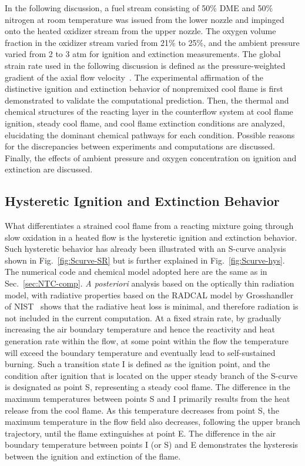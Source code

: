 In the following discussion, a fuel stream consisting of 50\% DME and 50\% nitrogen at room temperature was issued from the lower nozzle and impinged onto the heated oxidizer stream from the upper nozzle.  The oxygen volume fraction in the oxidizer stream varied from 21\% to 25\%, and the 
ambient pressure varied from 2 to 3 atm for ignition and extinction measurements.  The global strain rate used in the following discussion is defined as the pressure-weighted gradient of the axial flow velocity~\cite{seiser00}.  The experimental affirmation of the distinctive ignition and extinction behavior of nonpremixed cool flame is first demonstrated to validate the computational prediction.  Then, the thermal and chemical structures of the reacting layer in the counterflow system at cool flame ignition, steady cool flame, and cool flame extinction conditions are analyzed, elucidating the dominant chemical pathways for each condition.   Possible reasons for the discrepancies between experiments and computations are discussed.  Finally, the effects of ambient pressure and oxygen concentration on ignition and extinction are discussed.  

\subsection{Hysteretic Ignition and Extinction Behavior}

What differentiates a strained cool flame from a reacting mixture going through slow oxidation in a heated flow is the hysteretic ignition and extinction behavior.  Such hysteretic behavior has already been illustrated with an S-curve analysis shown in Fig.~\ref{fig:Scurve-SR} but is further explained in Fig.~\ref{fig:Scurve-hys}.  The numerical code and chemical model adopted here are the same as in Sec.~\ref{sec:NTC-comp}.  \emph{A posteriori} analysis based on the optically thin radiation model, with radiative properties based on the RADCAL model by Grosshandler of NIST~\cite{grosshandler93} shows that the radiative heat loss is minimal, and therefore radiation is not included in the current computation.  At a fixed strain rate, by gradually increasing the air boundary temperature and hence the reactivity and heat generation rate within the flow, at some point within the flow the temperature will exceed the boundary temperature and eventually lead to self-sustained burning.  Such a transition state I is defined as the ignition point, and the condition after ignition that is located on the upper steady branch of the S-curve is designated as point S, representing a steady cool flame.  The difference in the maximum temperatures between points S and I primarily results from the heat release from the cool flame.  As this temperature decreases from point S, the maximum temperature in the flow field also decreases, following the upper branch trajectory, until the flame extinguishes at point E.  The difference in the air boundary temperature between points I (or S) and E demonstrates the hysteresis between the ignition and extinction of the flame. 

